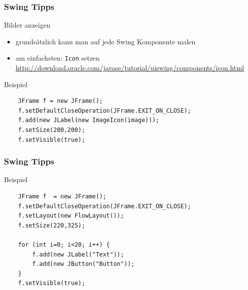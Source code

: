 \begin{frame}[fragile]
\frametitle{Swing Tipps}
\begin{block}{Bilder anzeigen}
\begin{itemize}
\item grundsätzlich kann man auf jede Swing Komponente malen \pause
\item am einfachsten: \texttt{Icon} setzen \\
\url{http://download.oracle.com/javase/tutorial/uiswing/components/icon.html}  \pause
\end{itemize}
\end{block}

\begin{block}{Beispiel}
\begin{lstlisting}
	JFrame f = new JFrame();
	f.setDefaultCloseOperation(JFrame.EXIT_ON_CLOSE);
	f.add(new JLabel(new ImageIcon(image)));
	f.setSize(200,200);
	f.setVisible(true);
\end{lstlisting}
\end{block}
\end{frame}

\begin{frame}[fragile]
\frametitle{Swing Tipps}
\begin{block}{Beispiel}
\begin{lstlisting}
	JFrame f  = new JFrame();
	f.setDefaultCloseOperation(JFrame.EXIT_ON_CLOSE);
	f.setLayout(new FlowLayout());
	f.setSize(220,325);

	for (int i=0; i<20; i++) {
	  	f.add(new JLabel("Text"));
	  	f.add(new JButton("Button"));
	}
	f.setVisible(true);
\end{lstlisting}
\end{block}
\end{frame}

